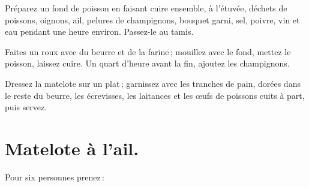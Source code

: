 Préparez un fond de poisson en faisant cuire ensemble, à l'étuvée, déchets de
poissons, oignons, ail, pelures de champignons, bouquet garni, sel, poivre, vin
et eau pendant une heure environ. Passez-le au tamis.

Faites un roux avec du beurre et de la farine ; mouillez avec le fond, mettez
le poisson, laissez cuire. Un quart d'heure avant la fin, ajoutez les
champignons.

Dressez la matelote sur un plat ; garnissez avec les tranches de pain, dorées
dans le reste du beurre, les écrevisses, les laitances et les œufs de poissons
cuits à part, puis servez.

\section*{\centering Matelote à l'ail.}

Pour six personnes prenez :


